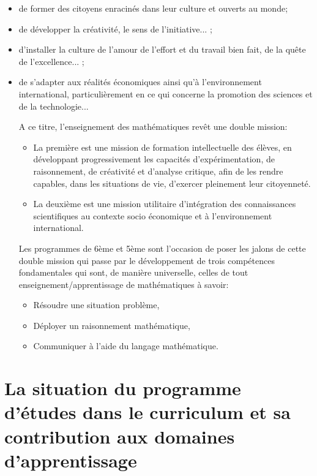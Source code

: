 \begin{itemize}
\item de former des citoyens enracinés dans leur culture et ouverts au monde;
\item de développer la créativité, le sens de l'initiative... ;
\item d'installer la culture de l'amour de l'effort et du travail bien fait, de la quête de l'excellence... ;
\item de s'adapter aux réalités économiques ainsi qu'à l'environnement international, particulièrement en ce qui concerne la promotion des sciences et de la technologie...

A ce titre, l'enseignement des mathématiques revêt une double mission:

\begin{itemize}
\item La première est une mission de formation intellectuelle des élèves, en développant progressivement les capacités d'expérimentation, de raisonnement, de créativité et d'analyse critique, afin de les rendre capables, dans les situations de vie, d'exercer pleinement leur citoyenneté.
\item La deuxième est une mission utilitaire d'intégration des connaissances scientifiques au contexte socio économique et à l'environnement international.
\end{itemize}

Les programmes de 6ème et 5ème sont l'occasion de poser les jalons de cette double mission qui passe par le développement de trois compétences fondamentales qui sont, de manière universelle, celles de tout enseignement/apprentissage de mathématiques à savoir:

\begin{itemize}
\item Résoudre une situation problème,
\item Déployer un raisonnement mathématique,
\item Communiquer à l'aide du langage mathématique.
\end{itemize}
\end{itemize}



\section*{La situation du programme d'études dans le curriculum et sa contribution aux domaines d'apprentissage}


